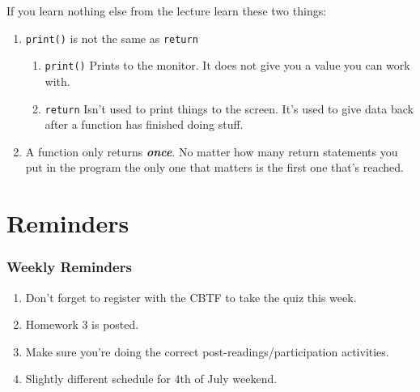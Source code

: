 \documentclass{beamer}
\begin{document}
%
%
\begin{frame}
  If you learn nothing else from the lecture learn these two things:
  \begin{enumerate}[A]
    \item \lstinline|print()| is not the same as \lstinline|return|
      \begin{enumerate}[A]
        \item  \lstinline|print()| \textrightarrow Prints to the monitor. It does not give you a value you can work with.
        \item  \lstinline|return| \textrightarrow Isn't used to print things to the screen. It's used to give data back after a function has finished doing stuff.
      \end{enumerate}
    \item A function only returns \textit{\textbf{once}}. No matter how many return statements you put in the program the only one that matters is the first one that's reached.
  \end{enumerate}
\end{frame}

\section{Reminders}
%
%
\begin{frame}
  \frametitle{Weekly Reminders}
  \begin{enumerate}[A]
    \item Don't forget to register with the CBTF to take the quiz this week.
    \item Homework 3 is posted.
    \item Make sure you're doing the correct post-readings/participation activities.
    \item Slightly different schedule for 4th of July weekend.
  \end{enumerate}
\end{frame}
\end{document}
